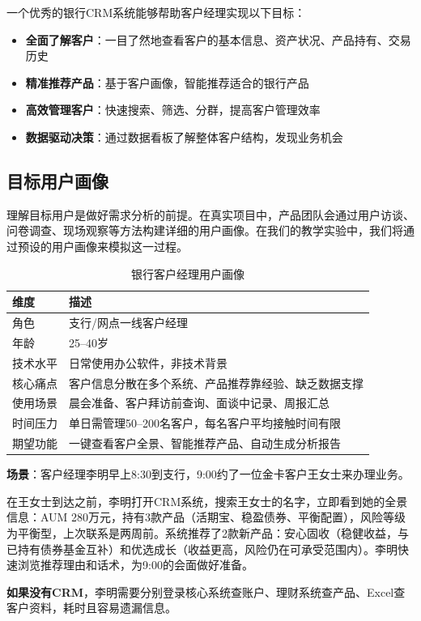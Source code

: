 一个优秀的银行CRM系统能够帮助客户经理实现以下目标：

\begin{itemize}[leftmargin=2em]
  \item \textbf{全面了解客户}：一目了然地查看客户的基本信息、资产状况、产品持有、交易历史
  \item \textbf{精准推荐产品}：基于客户画像，智能推荐适合的银行产品
  \item \textbf{高效管理客户}：快速搜索、筛选、分群，提高客户管理效率
  \item \textbf{数据驱动决策}：通过数据看板了解整体客户结构，发现业务机会
\end{itemize}

\subsection{目标用户画像}

理解目标用户是做好需求分析的前提。在真实项目中，产品团队会通过用户访谈、问卷调查、现场观察等方法构建详细的用户画像。在我们的教学实验中，我们将通过预设的用户画像来模拟这一过程。

\begin{table}[H]
\centering
\begin{tabular}{lp{9cm}}
\toprule
\textbf{维度} & \textbf{描述} \\
\midrule
角色 & 支行/网点一线客户经理 \\
年龄 & 25--40岁 \\
技术水平 & 日常使用办公软件，非技术背景 \\
核心痛点 & 客户信息分散在多个系统、产品推荐靠经验、缺乏数据支撑 \\
使用场景 & 晨会准备、客户拜访前查询、面谈中记录、周报汇总 \\
时间压力 & 单日需管理50--200名客户，每名客户平均接触时间有限 \\
期望功能 & 一键查看客户全景、智能推荐产品、自动生成分析报告 \\
\bottomrule
\end{tabular}
\caption{银行客户经理用户画像}
\end{table}

\begin{casebox}[典型使用场景]
\textbf{场景}：客户经理李明早上8:30到支行，9:00约了一位金卡客户王女士来办理业务。\par

在王女士到达之前，李明打开CRM系统，搜索王女士的名字，立即看到她的全景信息：AUM 280万元，持有3款产品（活期宝、稳盈债券、平衡配置），风险等级为平衡型，上次联系是两周前。系统推荐了2款新产品：安心固收（稳健收益，与已持有债券基金互补）和优选成长（收益更高，风险仍在可承受范围内）。李明快速浏览推荐理由和话术，为9:00的会面做好准备。\par

\textbf{如果没有CRM}，李明需要分别登录核心系统查账户、理财系统查产品、Excel查客户资料，耗时且容易遗漏信息。\end{casebox}

